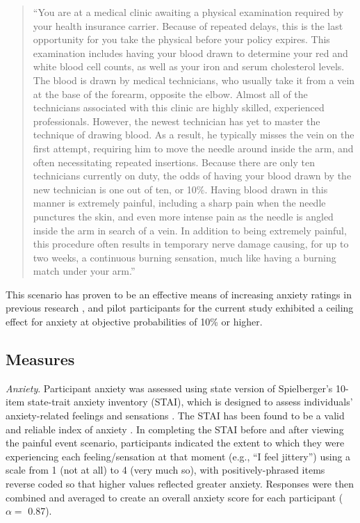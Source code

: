 \documentclass[review]{elsarticle}\usepackage[]{graphicx}\usepackage[]{color}
\begin{document}
\begin{quote}
``You are at a medical clinic awaiting a physical examination required by your health insurance carrier.
Because of repeated delays, this is the last opportunity for you take the physical before your policy expires.
This examination includes having your blood drawn to determine your red and white blood cell counts, as well as your iron and serum cholesterol levels.
The blood is drawn by medical technicians, who usually take it from a vein at the base of the forearm, opposite the elbow.
Almost all of the technicians associated with this clinic are highly skilled, experienced professionals.
However, the newest technician has yet to master the technique of drawing blood.
As a result, he typically misses the vein on the first attempt, requiring him to move the needle around inside the arm, and often necessitating repeated insertions.
Because there are only ten technicians currently on duty, the odds of having your blood drawn by the new technician is one out of ten, or 10\%.
Having blood drawn in this manner is extremely painful, including a sharp pain when the needle punctures the skin, and even more intense pain as the needle is angled inside the arm in search of a vein. In addition to being extremely painful, this procedure often results in temporary nerve damage causing, for up to two weeks, a continuous burning sensation, much like having a burning match under your arm.''
\end{quote}

This scenario has proven to be an effective means of increasing anxiety ratings in previous research \cite{moore2010cognitive,kennedy2011makes}, and pilot participants for the current study exhibited a ceiling effect for anxiety at objective probabilities of 10\% or higher.

\subsection*{Measures}
\label{sub:measures}

\emph{Anxiety}. Participant anxiety was assessed using state version of Spielberger's 10-item state-trait anxiety inventory (STAI), which is designed to assess individuals' anxiety-related feelings and sensations \cite{spielberger1983assessment}.
The STAI has been found to be a valid and reliable index of anxiety \cite{bados2010state,marteau1992development}.
In completing the STAI before and after viewing the painful event scenario, participants indicated the extent to which they were experiencing each feeling/sensation at that moment (e.g., ``I feel jittery'') using a scale from 1 (not at all) to 4 (very much so), with positively-phrased items reverse coded so that higher values reflected greater anxiety.
Responses were then combined and averaged to create an overall anxiety score for each participant ($\alpha = $ 0.87).
\end{document}
